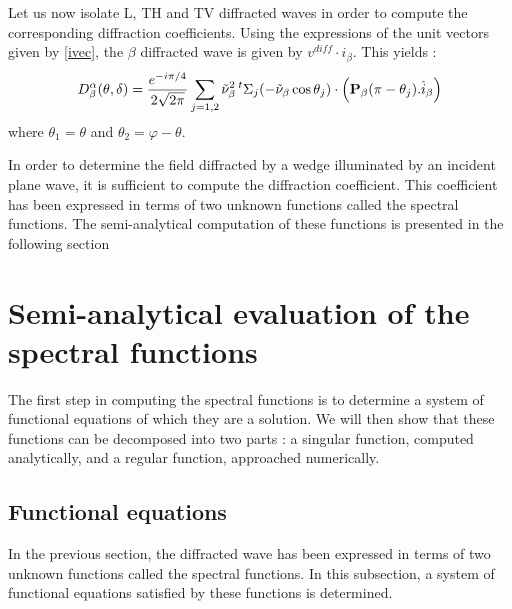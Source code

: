Let us now isolate L, TH and TV diffracted waves in order to compute the corresponding diffraction coefficients. Using the expressions of the unit vectors given by \eqref{ivec}, the $\beta$ diffracted wave is given by $v^{diff}\cdot \hat{i}_{\beta}$. This yields :
\begin{equation}
D_{\beta}^{\alpha}(\theta,\delta)=\frac{e^{-i\pi/4}}{2\sqrt{2\pi}}\sum_{j=1,2}\tilde{\nu}_{\beta}^2 \,{}^t \Sigma_j(-\tilde{\nu}_{\beta}\cos\theta_j)\cdot\left(\mathbf{P}_{\beta}(\pi-\theta_j).\hat{i}_{\beta}\right)
\label{C4:Dbeta}
\end{equation}
where $\theta_1=\theta$ and $\theta_2=\varphi-\theta$.

In order to determine the field diffracted by a wedge illuminated by an incident plane wave, it is sufficient to compute the diffraction coefficient. This coefficient has been expressed in terms of two unknown functions called the spectral functions. The semi-analytical computation of these functions is presented in the following section

\section{Semi-analytical evaluation of the spectral functions}
The first step in computing the spectral functions is to determine a system of functional equations of which they are a solution. We will then show that these functions can be decomposed into two parts : a singular function, computed analytically, and a regular function, approached numerically.
\subsection{Functional equations}
In the previous section, the diffracted wave has been expressed in terms of two unknown functions called the spectral functions. In this subsection, a system of functional equations satisfied by these functions is determined. 

